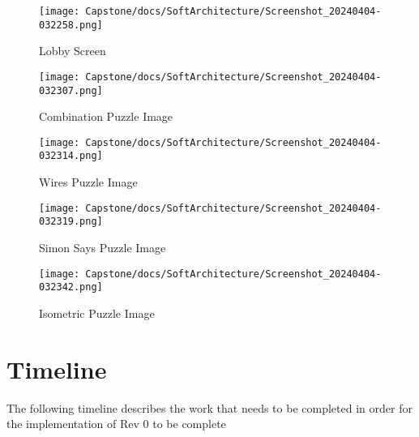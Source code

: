 \documentclass[12pt, titlepage]{article}
\begin{document}
\begin{figure}[H]
\centering
\texttt{[image: Capstone/docs/SoftArchitecture/Screenshot\_20240404-032258.png]}
\caption{Lobby Screen}
\label{FigUI5}
\end{figure}


\begin{figure}[H]
\centering
\texttt{[image: Capstone/docs/SoftArchitecture/Screenshot\_20240404-032307.png]}
\caption{Combination Puzzle Image}
\label{FigUI6}
\end{figure}

\begin{figure}[H]
\centering
\texttt{[image: Capstone/docs/SoftArchitecture/Screenshot\_20240404-032314.png]}
\caption{Wires Puzzle Image}
\label{FigUI6}
\end{figure}
\begin{figure}[H]
\centering
\texttt{[image: Capstone/docs/SoftArchitecture/Screenshot\_20240404-032319.png]}
\caption{Simon Says Puzzle Image}
\label{FigUI6}
\end{figure}

\begin{figure}[H]
\centering
\texttt{[image: Capstone/docs/SoftArchitecture/Screenshot\_20240404-032342.png]}
\caption{Isometric Puzzle Image}
\label{FigUI6}
\end{figure}

\section{Timeline} \label{Rev0Timeline}
The following timeline describes the work that needs to be completed in order for the implementation of Rev 0 to be complete
\end{document}
